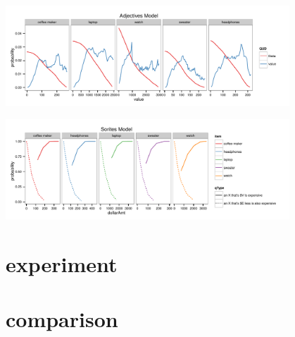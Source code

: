\documentclass[10pt]{article}
\begin{document}
\includegraphics[width=0.8\textwidth]{adjective.pdf}

\includegraphics[width=0.8\textwidth]{sorites_model.pdf}

\section{experiment}

\section{comparison}
% 
% 
% 
% 

\end{document}
